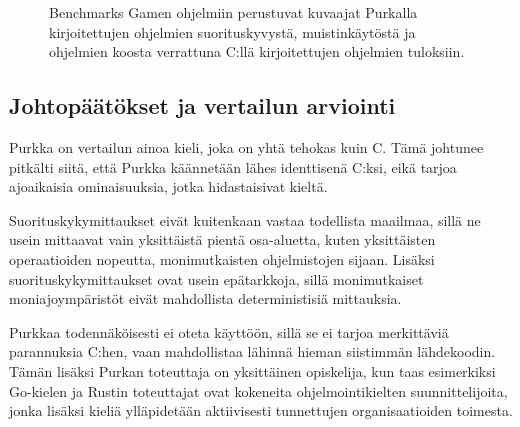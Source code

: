 \begin{figure}[ht!]
    \begin{adjustbox}{center}
        \begin{minipage}{1.25\textwidth}
        
        \end{minipage}
    \end{adjustbox}

    \begin{adjustbox}{center}
        \begin{minipage}{1.25\textwidth}
        
        \end{minipage}
    \end{adjustbox}

    \begin{adjustbox}{center}
        \begin{minipage}{1.25\textwidth}
        
        \end{minipage}
    \end{adjustbox}
    \caption{
        Benchmarks Gamen ohjelmiin perustuvat kuvaajat Purkalla kirjoitettujen ohjelmien
        suorituskyvystä, muistinkäytöstä ja ohjelmien koosta verrattuna C:llä
        kirjoitettujen ohjelmien tuloksiin.}
    \label{fig:purkkabenchmarksgame}
\end{figure}

\FloatBarrier

\subsection{Johtopäätökset ja vertailun arviointi}

Purkka on vertailun ainoa kieli, joka on yhtä tehokas kuin C. Tämä johtunee
pitkälti siitä, että Purkka käännetään lähes identtisenä C:ksi, eikä tarjoa
ajoaikaisia ominaisuuksia, jotka hidastaisivat kieltä.

Suorituskykymittaukset eivät kuitenkaan vastaa todellista maailmaa, sillä ne
usein mittaavat vain yksittäistä pientä osa-aluetta, kuten yksittäisten
operaatioiden nopeutta, monimutkaisten ohjelmistojen sijaan. Lisäksi
suorituskykymittaukset ovat usein epätarkkoja, sillä monimutkaiset
moniajoympäristöt eivät mahdollista deterministisiä mittauksia.

Purkkaa todennäköisesti ei oteta käyttöön, sillä se ei tarjoa merkittäviä
parannuksia C:hen, vaan mahdollistaa lähinnä hieman siistimmän lähdekoodin.
Tämän lisäksi Purkan toteuttaja on yksittäinen opiskelija, kun taas esimerkiksi
Go-kielen ja Rustin toteuttajat ovat kokeneita ohjelmointikielten
suunnittelijoita, jonka lisäksi kieliä ylläpidetään aktiivisesti tunnettujen
organisaatioiden toimesta.

